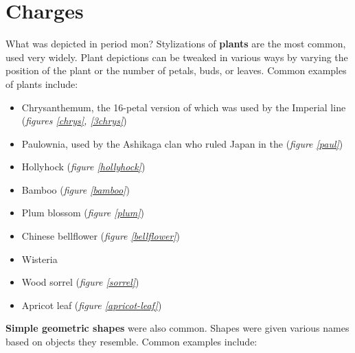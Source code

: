 \documentclass{article}
\begin{document}
\section{Charges}

  What was depicted in period mon?  Stylizations of \textbf{plants} are the
  most common, used very widely.  Plant depictions can be tweaked in
  various ways by varying the position of the plant or the number of
  petals, buds, or leaves.  Common examples of plants include:

\begin{multicols}{2}
  \begin{itemize}
\item Chrysanthemum, the 16-petal version of which was
  used by the Imperial line (\emph{figures \ref{chrys}, \ref{3chrys}})
\item Paulownia, used by the Ashikaga clan who ruled Japan in the \MuromachiPeriod{} (\emph{figure \ref{paul}})
\item Hollyhock (\emph{figure \ref{hollyhock}})
\item Bamboo (\emph{figure \ref{bamboo}})
\item Plum blossom (\emph{figure \ref{plum}})
\item Chinese bellflower (\emph{figure \ref{bellflower}})
\item Wisteria
\item Wood sorrel (\emph{figure \ref{sorrel}})
\item Apricot leaf (\emph{figure \ref{apricot-leaf}})
  \end{itemize}
\end{multicols}

  \textbf{Simple geometric shapes} were also common.  Shapes were given
  various names based on objects they resemble.  Common examples
  include:
\end{document}
